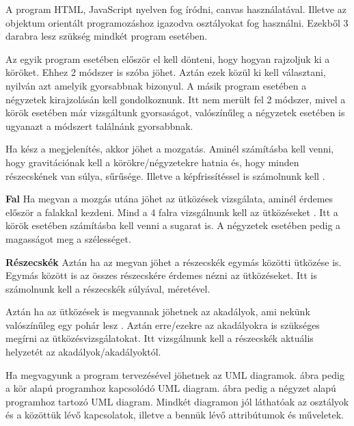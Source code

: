 A program HTML, JavaScript nyelven fog íródni, canvas használatával. Illetve az objektum orientált programozáshoz igazodva osztályokat fog használni. Ezekből 3 darabra lesz szükség mindkét program esetében. 




Az egyik program esetében először el kell dönteni, hogy hogyan rajzoljuk ki a köröket. Ehhez 2 módszer is szóba jöhet. Aztán ezek közül ki kell választani, nyilván azt amelyik gyorsabbnak bizonyul. 
A másik program esetében a négyzetek kirajzolásán kell gondolkoznunk. Itt nem merült fel 2 módszer, mivel a körök esetében már vizsgáltunk gyorsaságot, valószínűleg a négyzetek esetében is ugyanazt a módszert találnánk gyorsabbnak.


Ha kész a megjelenítés, akkor jöhet a mozgatás. Aminél számításba kell venni, hogy gravitációnak kell a körökre/négyzetekre hatnia  és, hogy minden részecskének van súlya, sűrűsége. Illetve a képfrissítéssel is számolnunk kell \cite{game}.



\textbf{Fal}
Ha megvan a mozgás utána jöhet az ütközések vizsgálata, aminél érdemes először a falakkal kezdeni. Mind a 4 falra vizsgálnunk kell az ütközéseket \cite{bounce}. Itt a körök esetében számításba kell venni a sugarat is. A négyzetek esetében pedig a magasságot meg a szélességet. 

\textbf{Részecskék}
Aztán ha az megvan jöhet a részecskék egymás közötti ütközése is. Egymás között is az összes részecskére érdemes nézni az ütközéseket. Itt is számolnunk kell a részecskék súlyával, méretével. 


Aztán ha az ütközések is megvannak jöhetnek az akadályok, ami nekünk valószínűleg egy pohár lesz \cite{collision}. Aztán erre/ezekre az akadályokra is szükséges megírni az ütközésvizsgálatokat. Itt vizsgálnunk kell a részecskék aktuális helyzetét az akadályok/akadályoktól.


Ha megvagyunk a program tervezésével jöhetnek az UML diagramok.  ábra pedig a kör alapú programhoz kapcsolódó UML diagram.  ábra pedig a négyzet alapú programhoz tartozó UML diagram. Mindkét diagramon jól láthatóak az osztályok és a közöttük lévő kapcsolatok, illetve a bennük lévő attribútumok és műveletek.


